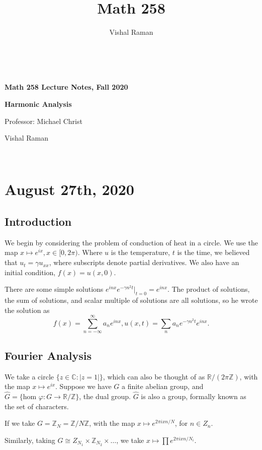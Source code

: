 \documentclass[11pt]{scrartcl}
\newcommand{\Z}{\mathbb{Z}}
\newcommand{\R}{\mathbb{R}}
\newcommand{\C}{\mathbb C}
\let \phi \varphi
\let \hat \widehat
\newcommand{\<}{\langle}
\renewcommand{\>}{\rangle}
\begin{document}
\title{Math 258}
\author{Vishal Raman}
\thispagestyle{empty}
$ $
\vfill
\begin{center}

\centerline{\huge \textbf{Math 258 Lecture Notes, Fall 2020}}
\centerline{\Large \textbf{Harmonic Analysis} } 
\centerline{Professor: Michael Christ}
\centerline{Vishal Raman}
\end{center}
\vfill
$ $
\newpage
\thispagestyle{empty}
\tableofcontents
\newpage
\section{August 27th, 2020}
\subsection{Introduction}
We begin by considering the problem of conduction of heat in a circle.  We use the map $x \mapsto e^{ix}, x \in [0, 2\pi)$.  Where $u$ is the temperature, $t$ is the time, we believed that $u_t = \gamma u_{xx}$, where subscripts denote partial derivatives.  We also have an initial condition, $f(x) = u(x, 0)$.

There are some simple solutions $e^{inx}e^{-\gamma n^2t}|_{t=0} = e^{inx}$.  The product of solutions, the sum of solutions, and scalar multiple of solutions are all solutions, so he wrote the solution as $$f(x) = \sum_{n = -\infty}^{\infty} a_n e^{inx}, u(x, t) = \sum_{n} a_n e^{-\gamma n^2t}e^{inx}.$$

\subsection{Fourier Analysis}
We take a circle $\{z \in \C : |z = 1|\}$, which can also be thought of as $\R/(2\pi\Z)$, with the map $x \mapsto e^{ix}$. 
 Suppose we have $G$ a finite abelian group, and $\hat{G} = \{\text{hom }\phi:G \rightarrow \R/\Z \}$, the dual group.  $\hat{G}$ is also a group, formally known as the set of characters.

\begin{example} If we take $G = \Z_N = \Z/N\Z$, with the map $x \mapsto e^{2\pi i xn/N}$, for $n \in Z_n$.

 Similarly, taking $G \cong Z_{N_1} \times \Z_{N_2} \times \dots$, we take $x \mapsto \prod e^{2\pi i xn/N_i}$.
\end{example}
\end{document}
